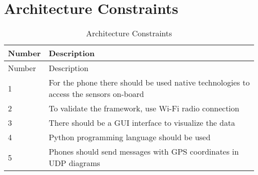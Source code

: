 \section{Architecture Constraints}\label{architecture-constraints}

\begin{longtable}[]{@{}ll@{}}
	\caption{Architecture Constraints}\tabularnewline
	\toprule
	\begin{minipage}[b]{0.09\columnwidth}\raggedright
		Number\strut
	\end{minipage} & \begin{minipage}[b]{0.85\columnwidth}\raggedright
		Description\strut
	\end{minipage}\tabularnewline
	\midrule
	\endfirsthead
	\toprule
	\begin{minipage}[b]{0.09\columnwidth}\raggedright
		Number\strut
	\end{minipage} & \begin{minipage}[b]{0.85\columnwidth}\raggedright
		Description\strut
	\end{minipage}\tabularnewline
	\midrule
	\endhead
	\begin{minipage}[t]{0.09\columnwidth}\raggedright
		1\strut
	\end{minipage} & \begin{minipage}[t]{0.85\columnwidth}\raggedright
		For the phone there should be used native technologies to access the
		sensors on-board\strut
	\end{minipage}\tabularnewline
	\begin{minipage}[t]{0.09\columnwidth}\raggedright
		2\strut
	\end{minipage} & \begin{minipage}[t]{0.85\columnwidth}\raggedright
		To validate the framework, use Wi-Fi radio connection\strut
	\end{minipage}\tabularnewline
	\begin{minipage}[t]{0.09\columnwidth}\raggedright
		3\strut
	\end{minipage} & \begin{minipage}[t]{0.85\columnwidth}\raggedright
		There should be a GUI interface to visualize the data\strut
	\end{minipage}\tabularnewline
	\begin{minipage}[t]{0.09\columnwidth}\raggedright
		4\strut
	\end{minipage} & \begin{minipage}[t]{0.85\columnwidth}\raggedright
		Python programming language should be used\strut
	\end{minipage}\tabularnewline
	\begin{minipage}[t]{0.09\columnwidth}\raggedright
		5\strut
	\end{minipage} & \begin{minipage}[t]{0.85\columnwidth}\raggedright
		Phones should send messages with GPS coordinates in UDP diagrams\strut
	\end{minipage}\tabularnewline
	\bottomrule
\end{longtable}
